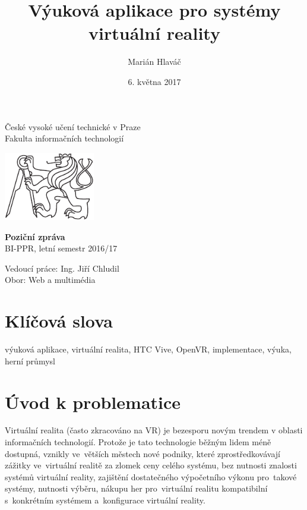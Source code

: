 \documentclass[12pt, a4paper]{article}
\title{Výuková aplikace pro systémy virtuální reality}
\author{Marián Hlaváč}
\date{6. května 2017}
\begin{document}
\begin{center}
České vysoké učení technické v Praze\\
Fakulta informačních technologií
\end{center}

\vspace{1cm}

\begin{center}
\includegraphics[height=3cm]{cvut-logo-bw}
\end{center}

\vspace{3cm}

{\let\newpage\relax\maketitle}

\begin{center}
\textbf{Poziční zpráva}\\
BI-PPR, letní semestr 2016/17\\
\end{center}

\begin{center}
Vedoucí práce: Ing. Jiří Chludil\\
Obor: Web a multimédia\\
\end{center}
\clearpage

\section{Klíčová slova}

výuková aplikace, virtuální realita, HTC Vive, OpenVR, implementace, výuka, herní průmysl

\section{Úvod k problematice}

Virtuální realita (často zkracováno na VR) je bezesporu novým trendem v oblasti informačních technologií. Protože je tato technologie běžným lidem méně dostupná, vznikly ve~větších městech nové podniky, které zprostředkovávají zážitky ve~virtuální realitě za zlomek ceny celého systému, bez nutnosti znalosti systémů virtuální reality, zajištění dostatečného výpočetního výkonu pro~takové systémy, nutnosti výběru, nákupu her pro~virtuální realitu kompatibilní s~konkrétním systémem a~konfigurace virtuální reality.
\end{document}
